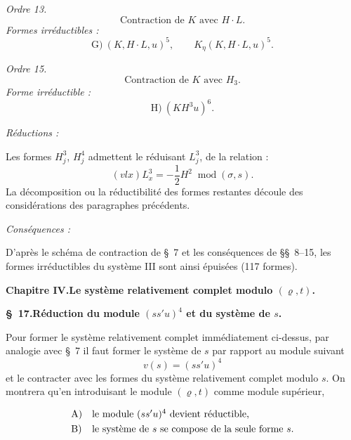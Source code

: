\documentclass[11pt]{article}
\newcommand{\modu}[1]{\;\operatorname{mod} #1}
\providecommand{\modu}[1]{\;\operatorname{mod} #1}
\begin{document}
\noindent\emph{Ordre 13.}
\[
\text{Contraction de }K\text{ avec }H\cdot L.
\]
\noindent\emph{Formes irréductibles :}
\[
\text{G)}\ (K,H\cdot L,u)^5,
\qquad K_\eta(K,H\cdot L,u)^5.
\]

\noindent\emph{Ordre 15.}
\[
\text{Contraction de }K\text{ avec }H_3.
\]
\noindent\emph{Forme irréductible :}
\[
\text{H)}\ (KH^3u)^6.
\]

\noindent\emph{Réductions :}

Les formes $H_j^3$, $H_j^4$ admettent le réduisant $L_j^3$, de la relation :
\[
(v lx)L_x^3=-\frac12H^2\modu{(\sigma,s)}.
\]
La décomposition ou la réductibilité des formes restantes découle des considérations des paragraphes précédents.

\noindent\emph{Conséquences :}

D'après le schéma de contraction de \S\ 7 et les conséquences de \S\S\ 8--15, les formes irréductibles du système III sont ainsi épuisées (117 formes).

\clearpage

\begin{center}
{\Large\bfseries Chapitre IV.\quad Le système relativement complet modulo $(\varrho,t)$.}
\end{center}

\begin{center}
\textbf{\S\ 17.\quad Réduction du module $(ss'u)^4$ et du système de $s$.}
\end{center}

Pour former le système relativement complet immédiatement ci-dessus, par analogie avec \S\ 7 il faut former le système de $s$ par rapport au module suivant
\[
v(s)=(ss'u)^4
\]
et le contracter avec les formes du système relativement complet modulo $s$. On montrera qu'en introduisant le module $(\varrho,t)$ comme module supérieur,
\[
\begin{array}{ll}
\text{A)}&\text{le module }(ss'u)^4\text{ devient réductible,}\vphantom{\dfrac11}\\
\text{B)}&\text{le système de }s\text{ se compose de la seule forme }s.
\end{array}
\]
\end{document}

